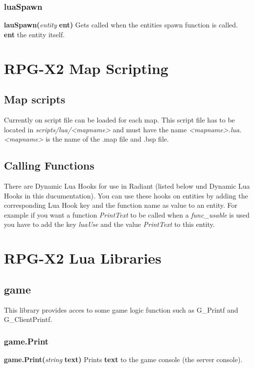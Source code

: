 \documentclass{scrreprt}
\begin{document}
\subsection{luaSpawn}
\label{luaSpawn}
\textbf{lauSpawn(}\textit{entity}\textbf{ ent)}
\newline
Gets called when the entities spawn function is called.
\newline
\textbf{ent} the entity itself.
\newpage
\chapter{RPG-X2 Map Scripting}
\label{rpgx2-mapscripting}
\section{Map scripts}
\label{map-scripts}
Currently on script file can be loaded for each map. This script file has to be located in \textit{scripts/lua/<mapname>} and must have the name \textit{<mapname>.lua}. \textit{<mapname>} is the name of the .map file and .bsp file.
\section{Calling Functions}
\label{map-callingfunction}
There are Dynamic Lua Hooks for use in Radiant (listed below und Dynamic Lua Hooks in this ducumentation). You can use these hooks on entities by adding the corresponding Lua Hook key and the function name as value to an entity.
\newline
For example if you want a function \textit{PrintText} to be called when a \textit{func\_usable} is used you have to add the key \textit{luaUse} and the value \textit{PrintText} to this entity.
\newpage
\chapter{RPG-X2 Lua Libraries}
\label{rpgx2-llibs}
\section{game}
\label{g}
This library provides acces to some game logic function such as G\_Printf \newline
and G\_ClientPrintf.
\subsection{game.Print}
\label{g-prnt}
\textbf{game.Print(}\textit{string}\textbf{ text)}
\newline
Prints \textbf{text} to the game console (the server console).
\end{document}
